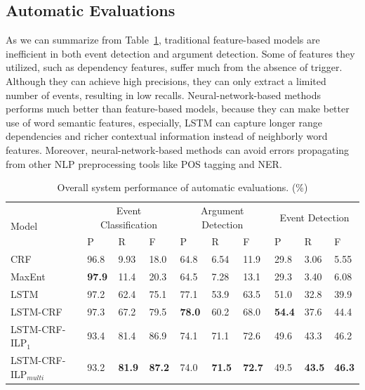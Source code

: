 \documentclass{article}
\begin{document}
\subsection{Automatic Evaluations}
As we can summarize from Table~\ref{tab:1}, traditional feature-based models are inefficient in both event detection and argument detection. Some of features they utilized, such as dependency features, suffer much from the absence of trigger. Although they can achieve high precisions, they can only extract a limited number of events, resulting in low recalls. Neural-network-based methods performs much better than feature-based models, because they can make better use of word semantic features, especially, LSTM can capture longer range dependencies and richer contextual information instead of neighborly word features. Moreover, neural-network-based methods can avoid errors propagating from other NLP preprocessing tools like POS tagging and NER.

\begin{table}[!t]
\centering
\small
\begin{tabular}{|l|p{0.8cm}<{\centering}|p{0.8cm}<{\centering}|p{0.8cm}<{\centering}|p{0.8cm}<{\centering}|p{0.8cm}<{\centering}|p{0.8cm}<{\centering}|p{0.8cm}<{\centering}|p{0.8cm}<{\centering}|p{0.8cm}<{\centering}|} \hline
	\multirow{2}{*}{Model} & \multicolumn{3}{c|}{Event Classification} & \multicolumn{3}{c|}{Argument Detection} & 
	\multicolumn{3}{c|}{Event Detection} \\ \cline{2-10}
	 & P & R & F & P & R & F & P & R & F \\ \hline
	CRF & 96.8 & 9.93 & 18.0 & 64.8 & 6.54 & 11.9 & 29.8 & 3.06 & 5.55 \\ \hline
	MaxEnt & \textbf{97.9} & 11.4 & 20.3 & 64.5 & 7.28 & 13.1 & 29.3 & 3.40 & 6.08 \\ \hline
	LSTM & 97.2 & 62.4 & 75.1 & 77.1 & 53.9 & 63.5 & 51.0 & 32.8 & 39.9  \\ \hline \hline
	LSTM-CRF & 97.3 & 67.2 & 79.5 & \textbf{78.0} & 60.2 & 68.0  & \textbf{54.4} & 37.6 & 44.4  \\ \hline
	LSTM-CRF-ILP$_{1}$ & 93.4 & 81.4 & 86.9 & 74.1 & 71.1 & 72.6  & 49.6 & 43.3 & 46.2 \\ \hline
	LSTM-CRF-ILP$_{multi}$ & 93.2 & \textbf{81.9} & \textbf{87.2} &  74.0 & \textbf{71.5} & \textbf{72.7} & 49.5 & \textbf{43.5} & \textbf{46.3} \\ \hline
\end{tabular}
\caption{Overall system performance of automatic evaluations. (\%) \label{tab:1}}
\end{table}
\end{document}
